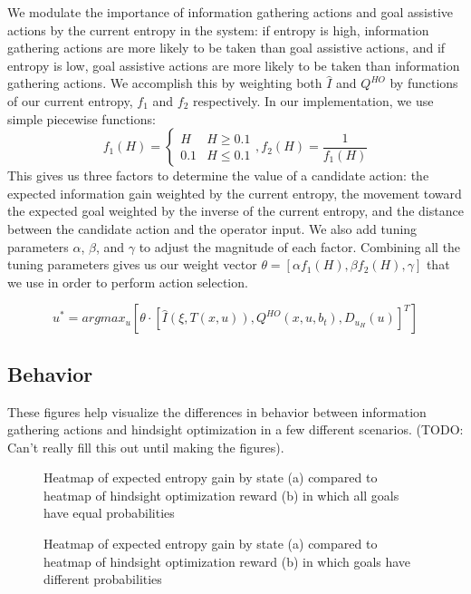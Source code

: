 \documentclass[conference]{IEEEtran}
\begin{document}
We modulate the importance of information gathering actions and goal assistive actions by the current entropy in the system: if entropy is high, information gathering actions are more likely to be taken than goal assistive actions, and if entropy is low, goal assistive actions are more likely to be taken than information gathering actions. We accomplish this by weighting both $\hat{I}$ and $Q^{HO}$ by functions of our current entropy, $f_1$ and $f_2$ respectively. In our implementation, we use simple piecewise functions:
\[
f_1(H) = 
\begin{cases}
H & H\geq 0.1 \\
0.1 & H\leq 0.1
\end{cases}
,f_2(H) = \frac{1}{f_1(H)}
\]
This gives us three factors to determine the value of a candidate action: the expected information gain weighted by the current entropy, the movement toward the expected goal weighted by the inverse of the current entropy, and the distance between the candidate action and the operator input. We also add tuning parameters $\alpha$, $\beta$, and $\gamma$ to adjust the magnitude of each factor. Combining all the tuning parameters gives us our weight vector $\theta = [\alpha f_1(H), \beta f_2(H), \gamma]$ that we use in order to perform action selection.

\[
u^* = argmax_u [ \theta \cdot [\hat{I}(\xi, T(x,u)), Q^{HO}(x,u,b_t), D_{u_H}(u)]^T ]
\]

\subsection{Behavior}

These figures help visualize the differences in behavior between information gathering actions and hindsight optimization in a few different scenarios. (TODO: Can't really fill this out until making the figures).

\begin{figure}
\caption{Heatmap of expected entropy gain by state (a) compared to heatmap of hindsight optimization reward (b) in which all goals have equal probabilities}
\label{heatmap1}
\end{figure}

\begin{figure}
\caption{Heatmap of expected entropy gain by state (a) compared to heatmap of hindsight optimization reward (b) in which goals have different probabilities}
\label{heatmap2}
\end{figure}
\end{document}
